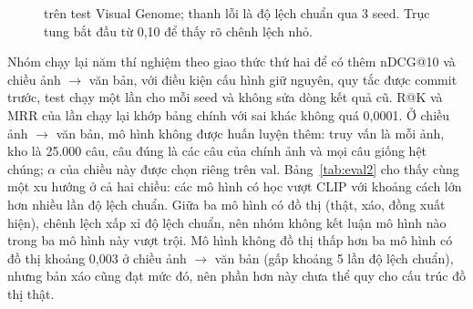 \begin{figure}[t]
\centering
{}
\caption{\mrr{} trên test Visual Genome; thanh lỗi là độ lệch chuẩn qua 3 seed. Trục tung bắt đầu từ 0,10 để thấy rõ chênh lệch nhỏ.}
\label{fig:mrr}
\end{figure}

Nhóm chạy lại năm thí nghiệm theo giao thức thứ hai để có thêm nDCG@10 và chiều ảnh $\to$ văn bản, với điều kiện cấu hình giữ nguyên, quy tắc được commit trước, test chạy một lần cho mỗi seed và không sửa dòng kết quả cũ. R@K và MRR của lần chạy lại khớp bảng chính với sai khác không quá 0,0001. Ở chiều ảnh $\to$ văn bản, mô hình không được huấn luyện thêm: truy vấn là mỗi ảnh, kho là 25.000 câu, câu đúng là các câu của chính ảnh và mọi câu giống hệt chúng; $\alpha$ của chiều này được chọn riêng trên val. Bảng~\ref{tab:eval2} cho thấy cùng một xu hướng ở cả hai chiều: các mô hình có học vượt CLIP với khoảng cách lớn hơn nhiều lần độ lệch chuẩn. Giữa ba mô hình có đồ thị (thật, xáo, đồng xuất hiện), chênh lệch xấp xỉ độ lệch chuẩn, nên nhóm không kết luận mô hình nào trong ba mô hình này vượt trội. Mô hình không đồ thị thấp hơn ba mô hình có đồ thị khoảng 0,003 \mrr{} ở chiều ảnh $\to$ văn bản (gấp khoảng 5 lần độ lệch chuẩn), nhưng bản xáo cũng đạt mức đó, nên phần hơn này chưa thể quy cho cấu trúc đồ thị thật.

